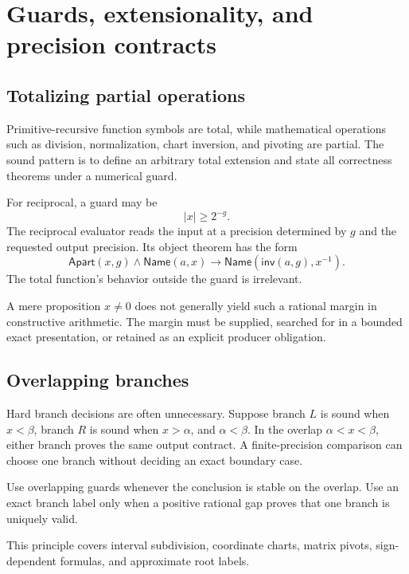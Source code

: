 \section{Guards, extensionality, and precision contracts}
\label{sec:guards}

\subsection{Totalizing partial operations}

Primitive-recursive function symbols are total, while mathematical operations
such as division, normalization, chart inversion, and pivoting are partial.
The sound pattern is to define an arbitrary total extension and state all
correctness theorems under a numerical guard.

For reciprocal, a guard may be
\[
  |x|\ge 2^{-g}.
\]
The reciprocal evaluator reads the input at a precision determined by \(g\)
and the requested output precision.  Its object theorem has the form
\[
 \mathsf{Apart}(x,g)\wedge\mathsf{Name}(a,x)
 \to \mathsf{Name}(\mathsf{inv}(a,g),x^{-1}).
\]
The total function's behavior outside the guard is irrelevant.

A mere proposition \(x\ne0\) does not generally yield such a rational margin in
constructive arithmetic.  The margin must be supplied, searched for in a
bounded exact presentation, or retained as an explicit producer obligation.

\subsection{Overlapping branches}

Hard branch decisions are often unnecessary.  Suppose branch \(L\) is sound
when \(x<\beta\), branch \(R\) is sound when \(x>\alpha\), and
\(\alpha<\beta\).  In the overlap \(\alpha<x<\beta\), either branch proves the
same output contract.  A finite-precision comparison can choose one branch
without deciding an exact boundary case.

\begin{principle}
Use overlapping guards whenever the conclusion is stable on the overlap.  Use
an exact branch label only when a positive rational gap proves that one branch
is uniquely valid.
\end{principle}

This principle covers interval subdivision, coordinate charts, matrix pivots,
sign-dependent formulas, and approximate root labels.

